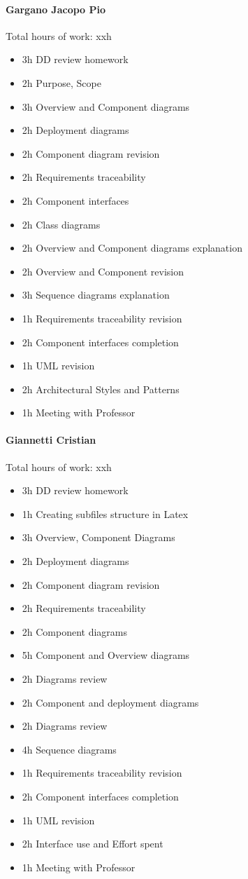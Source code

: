 \documentclass{report}
\begin{document}
		\paragraph{Gargano Jacopo Pio} Total hours of work: xxh
			\begin{itemize}
				\item 3h DD review homework
				\item 2h Purpose, Scope
				\item 3h Overview and Component diagrams
				\item 2h Deployment diagrams
				\item 2h Component diagram revision
				\item 2h Requirements traceability
				\item 2h Component interfaces
				\item 2h Class diagrams
				\item 2h Overview and Component diagrams explanation
				\item 2h Overview and Component revision
				\item 3h Sequence diagrams explanation
				\item 1h Requirements traceability revision
				\item 2h Component interfaces completion
				\item 1h UML revision
				\item 2h Architectural Styles and Patterns
				\item 1h Meeting with Professor
			\end{itemize}

		\paragraph{Giannetti Cristian} Total hours of work: xxh
			\begin{itemize}
				\item 3h DD review homework
				\item 1h Creating subfiles structure in Latex
				\item 3h Overview, Component Diagrams
				\item 2h Deployment diagrams
				\item 2h Component diagram revision
				\item 2h Requirements traceability
				\item 2h Component diagrams
				\item 5h Component and Overview diagrams
				\item 2h Diagrams review
				\item 2h Component and deployment diagrams
				\item 2h Diagrams review
				\item 4h Sequence diagrams
				\item 1h Requirements traceability revision
				\item 2h Component interfaces completion
				\item 1h UML revision
				\item 2h Interface use and Effort spent
				\item 1h Meeting with Professor
			\end{itemize}
\end{document}
